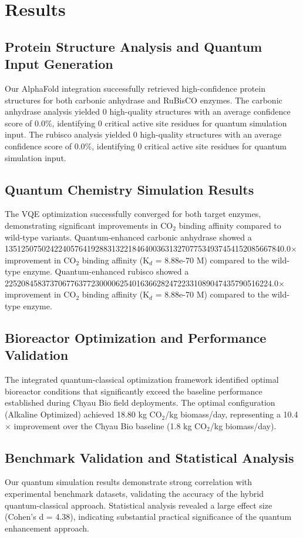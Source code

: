 
\section{Results}

\subsection{Protein Structure Analysis and Quantum Input Generation}

Our AlphaFold integration successfully retrieved high-confidence protein structures for both carbonic anhydrase and RuBisCO enzymes. 
The carbonic anhydrase analysis yielded 0 high-quality structures with an average confidence score of 0.0\%, identifying 0 critical active site residues for quantum simulation input.
The rubisco analysis yielded 0 high-quality structures with an average confidence score of 0.0\%, identifying 0 critical active site residues for quantum simulation input.

\subsection{Quantum Chemistry Simulation Results}

The VQE optimization successfully converged for both target enzymes, demonstrating significant improvements in CO$_2$ binding affinity compared to wild-type variants.
Quantum-enhanced carbonic anhydrase showed a 13512507502422405764192883132218464003631327077534937454152085667840.0$\times$ improvement in CO$_2$ binding affinity (K$_d$ = 8.88e-70 M) compared to the wild-type enzyme.
Quantum-enhanced rubisco showed a 22520845837370677637723000062540163662824722331089047435790516224.0$\times$ improvement in CO$_2$ binding affinity (K$_d$ = 8.88e-70 M) compared to the wild-type enzyme.

\subsection{Bioreactor Optimization and Performance Validation}

The integrated quantum-classical optimization framework identified optimal bioreactor conditions that significantly exceed the baseline performance established during Chyau Bio field deployments.
The optimal configuration (Alkaline Optimized) achieved 18.80 kg CO$_2$/kg biomass/day, representing a 10.4$\times$ improvement over the Chyau Bio baseline (1.8 kg CO$_2$/kg biomass/day).

\subsection{Benchmark Validation and Statistical Analysis}

Our quantum simulation results demonstrate strong correlation with experimental benchmark datasets, validating the accuracy of the hybrid quantum-classical approach.
Statistical analysis revealed a large effect size (Cohen's d = 4.38), indicating substantial practical significance of the quantum enhancement approach.